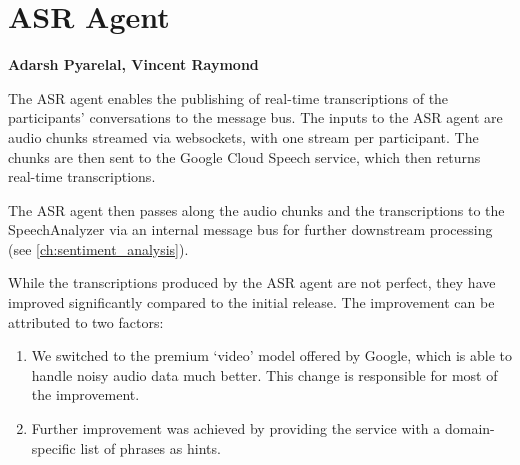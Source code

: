 \chapter{ASR Agent}
\label{ch:asr}
\textbf{Adarsh Pyarelal, Vincent Raymond}

The ASR agent enables the publishing of real-time transcriptions of the
participants' conversations to the message bus. The inputs to the ASR agent are
audio chunks streamed via websockets, with one stream per participant. The
chunks are then sent to the Google Cloud Speech service, which then returns
real-time transcriptions.

The ASR agent then passes along the audio chunks and the transcriptions to the
SpeechAnalyzer via an internal message bus for further downstream processing
(see \autoref{ch:sentiment_analysis}).

While the transcriptions produced by the ASR agent are not perfect, they have
improved significantly compared to the initial release. The improvement can be
attributed to two factors:

\begin{enumerate}
    \item We switched to the premium `video' model offered by Google, which is
        able to handle noisy audio data much better. This change is responsible
        for most of the improvement.
    \item Further improvement was achieved by providing the service with a
        domain-specific list of phrases as hints.
\end{enumerate}
